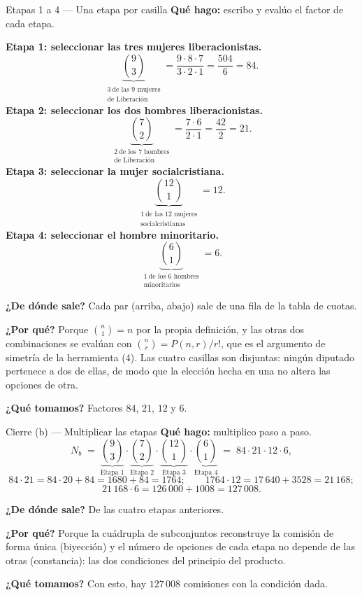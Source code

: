 \documentclass[11pt]{article}
\begin{document}
\begin{paso}{Etapas 1 a 4 --- Una etapa por casilla}
\textbf{Qu\'e hago:} escribo y eval\'uo el factor de cada etapa.

\medskip
\textbf{Etapa 1: seleccionar las tres mujeres liberacionistas.}
\[
\underbrace{\binom{9}{3}}_{\substack{3\ \text{de las 9 mujeres}\\ \text{de Liberaci\'on}}}=\frac{9\cdot 8\cdot 7}{3\cdot 2\cdot 1}=\frac{504}{6}=84 .
\]
\textbf{Etapa 2: seleccionar los dos hombres liberacionistas.}
\[
\underbrace{\binom{7}{2}}_{\substack{2\ \text{de los 7 hombres}\\ \text{de Liberaci\'on}}}=\frac{7\cdot 6}{2\cdot 1}=\frac{42}{2}=21 .
\]
\textbf{Etapa 3: seleccionar la mujer socialcristiana.}
\[
\underbrace{\binom{12}{1}}_{\substack{1\ \text{de las 12 mujeres}\\ \text{socialcristianas}}}=12 .
\]
\textbf{Etapa 4: seleccionar el hombre minoritario.}
\[
\underbrace{\binom{6}{1}}_{\substack{1\ \text{de los 6 hombres}\\ \text{minoritarios}}}=6 .
\]

\textbf{¿De d\'onde sale?} Cada par (arriba, abajo) sale de una fila de la tabla de cuotas.

\textbf{¿Por qu\'e?} Porque $\binom{n}{1}=n$ por la propia definici\'on, y las otras dos combinaciones se
eval\'uan con $\binom{n}{r}=P(n,r)/r!$, que es el argumento de simetr\'ia de la herramienta (4). Las cuatro
casillas son disjuntas: ning\'un diputado pertenece a dos de ellas, de modo que la elecci\'on hecha en una
no altera las opciones de otra.

\textbf{¿Qu\'e tomamos?} Factores $84$, $21$, $12$ y $6$.
\end{paso}

\begin{paso}{Cierre (b) --- Multiplicar las etapas}
\textbf{Qu\'e hago:} multiplico paso a paso.
\[
N_b\;=\;\underbrace{\binom{9}{3}}_{\text{Etapa 1}}\cdot\underbrace{\binom{7}{2}}_{\text{Etapa 2}}\cdot\underbrace{\binom{12}{1}}_{\text{Etapa 3}}\cdot\underbrace{\binom{6}{1}}_{\text{Etapa 4}}
\;=\;84\cdot 21\cdot 12\cdot 6 ,
\]
\[
84\cdot 21 = 84\cdot 20+84 = 1680+84 = 1764;\qquad
1764\cdot 12 = 17\,640+3528 = 21\,168;
\]
\[
21\,168\cdot 6 = 126\,000+1008 = 127\,008 .
\]

\textbf{¿De d\'onde sale?} De las cuatro etapas anteriores.

\textbf{¿Por qu\'e?} Porque la cu\'adrupla de subconjuntos reconstruye la comisi\'on de forma \'unica
(biyecci\'on) y el n\'umero de opciones de cada etapa no depende de las otras (constancia): las dos
condiciones del principio del producto.

\textbf{¿Qu\'e tomamos?} Con esto, hay $127\,008$ comisiones con la condici\'on dada.
\end{paso}
\end{document}
